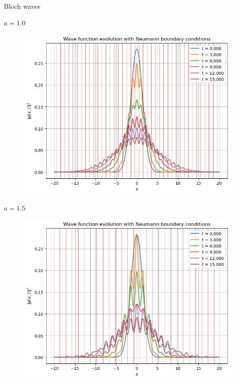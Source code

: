 \begin{frame}{Bloch waves}
    \begin{minipage}{0.32\textwidth}
        \begin{center}
            $a=1.0$
        \end{center}
        \vspace{-0.25cm}
        \begin{figure}
            \centering
            \includegraphics[width=\textwidth]{Immagini/plot-periodic-potential-a-1.png}
        \end{figure}
    \end{minipage}
    \hfill
    \begin{minipage}{0.32\textwidth}
        \begin{center}
            $a=1.5$
        \end{center}
        \vspace{-0.25cm}
        \begin{figure}
            \centering
            \includegraphics[width=\textwidth]{Immagini/plot-periodic-potential-a-1,5.png}

\end{figure}
\end{minipage}
\end{frame}
